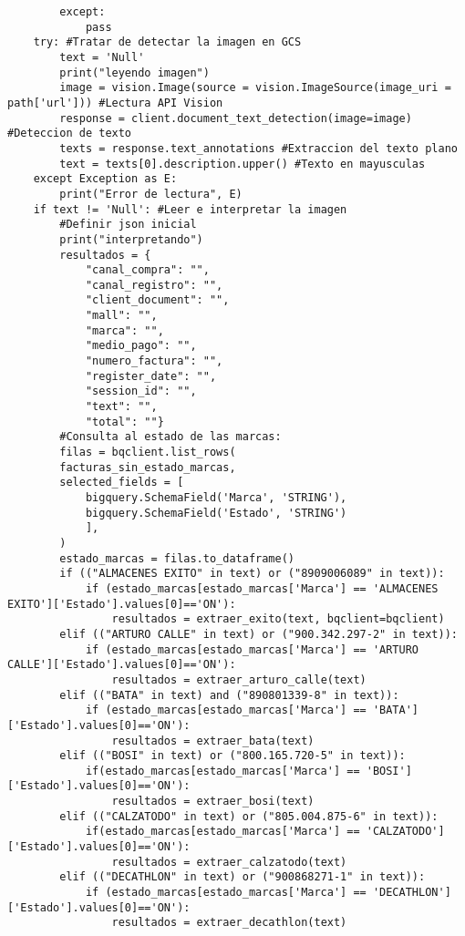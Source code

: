 \documentclass{article}
\begin{document}
\begin{lstlisting}
        except:
            pass
    try: #Tratar de detectar la imagen en GCS
        text = 'Null'
        print("leyendo imagen")
        image = vision.Image(source = vision.ImageSource(image_uri = path['url'])) #Lectura API Vision
        response = client.document_text_detection(image=image) #Deteccion de texto
        texts = response.text_annotations #Extraccion del texto plano
        text = texts[0].description.upper() #Texto en mayusculas
    except Exception as E:
        print("Error de lectura", E)
    if text != 'Null': #Leer e interpretar la imagen
        #Definir json inicial
        print("interpretando")
        resultados = {
            "canal_compra": "",
            "canal_registro": "",
            "client_document": "",
            "mall": "",
            "marca": "",
            "medio_pago": "",
            "numero_factura": "",
            "register_date": "",
            "session_id": "",
            "text": "",
            "total": ""}        
        #Consulta al estado de las marcas:
        filas = bqclient.list_rows(
        facturas_sin_estado_marcas,
        selected_fields = [
            bigquery.SchemaField('Marca', 'STRING'),
            bigquery.SchemaField('Estado', 'STRING')
            ],
        )
        estado_marcas = filas.to_dataframe()
        if (("ALMACENES EXITO" in text) or ("8909006089" in text)):
            if (estado_marcas[estado_marcas['Marca'] == 'ALMACENES EXITO']['Estado'].values[0]=='ON'):
                resultados = extraer_exito(text, bqclient=bqclient)
        elif (("ARTURO CALLE" in text) or ("900.342.297-2" in text)):
            if (estado_marcas[estado_marcas['Marca'] == 'ARTURO CALLE']['Estado'].values[0]=='ON'):
                resultados = extraer_arturo_calle(text)
        elif (("BATA" in text) and ("890801339-8" in text)):
            if (estado_marcas[estado_marcas['Marca'] == 'BATA']['Estado'].values[0]=='ON'):
                resultados = extraer_bata(text)
        elif (("BOSI" in text) or ("800.165.720-5" in text)):
            if(estado_marcas[estado_marcas['Marca'] == 'BOSI']['Estado'].values[0]=='ON'):
                resultados = extraer_bosi(text)
        elif (("CALZATODO" in text) or ("805.004.875-6" in text)):
            if(estado_marcas[estado_marcas['Marca'] == 'CALZATODO']['Estado'].values[0]=='ON'):
                resultados = extraer_calzatodo(text)
        elif (("DECATHLON" in text) or ("900868271-1" in text)):
            if (estado_marcas[estado_marcas['Marca'] == 'DECATHLON']['Estado'].values[0]=='ON'):
                resultados = extraer_decathlon(text)

\end{lstlisting}
\end{document}
